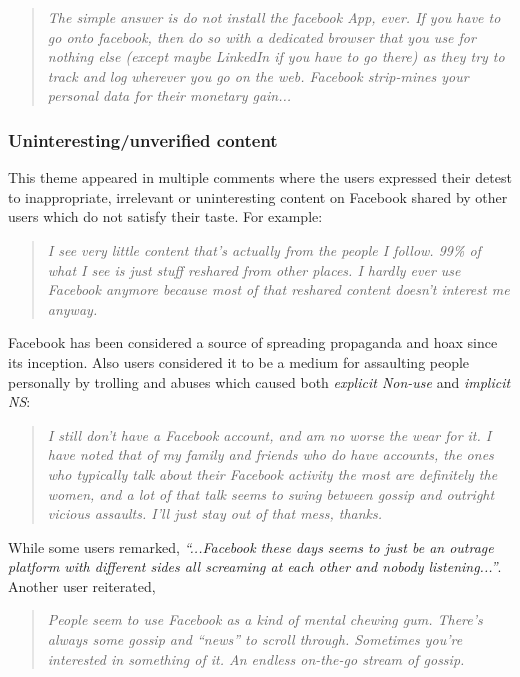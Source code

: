     \begin{quote}
         \textit{The simple answer is do not install the facebook App, ever. If you have to go onto facebook, then do so with a dedicated browser that you use for nothing else (except maybe LinkedIn if you have to go there) as they try to track and log wherever you go on the web. Facebook strip-mines your personal data for their monetary gain... }
    \end{quote}

    
 \subsubsection{Uninteresting/unverified content }
 This theme appeared in multiple comments where the users expressed their detest to inappropriate, irrelevant or uninteresting content on Facebook shared by other users which do not satisfy their taste. For example:
     \begin{quote}
         \textit{I see very little content that's actually from the people I follow. 99\% of what I see is just stuff reshared from other places. I hardly ever use Facebook anymore because most of that reshared content doesn't interest me anyway.}
     \end{quote}

Facebook has been considered a source of spreading propaganda and hoax since its inception. Also users considered it to be a medium for assaulting people personally by trolling and abuses which caused both \emph{explicit Non-use} and \emph{implicit NS}:
\begin{quote}
         \textit{I still don't have a Facebook account, and am no worse the wear for it. I have noted that of my family and friends who do have accounts, the ones who typically talk about their Facebook activity the most are definitely the women, and a lot of that talk seems to swing between gossip and outright vicious assaults. I'll just stay out of that mess, thanks.}
    \end{quote}

While some users remarked, \textit{``...Facebook these days seems to just be an outrage platform with different sides all screaming at each other and nobody listening...''}. Another user reiterated,
\begin{quote}
         \textit{People seem to use Facebook as a kind of mental chewing gum. There's always some gossip and ``news'' to scroll through. Sometimes you're interested in something of it. An endless on-the-go stream of gossip.}
    \end{quote}

